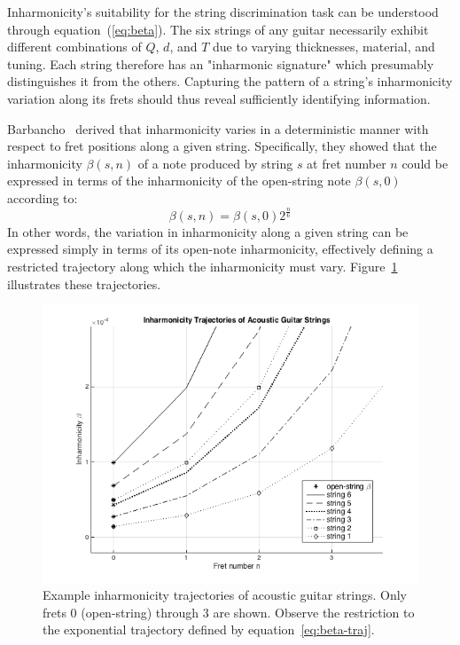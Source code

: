 \documentclass[12pt]{cmuthesis}
\begin{document}

Inharmonicity's suitability for the string discrimination task can be understood through equation~(\ref{eq:beta}). The six strings of any guitar necessarily exhibit different combinations of $Q$, $d$, and $T$ due to varying thicknesses, material, and tuning. Each string therefore has an "inharmonic signature" which presumably distinguishes it from the others. Capturing the pattern of a string's inharmonicity variation along its frets should thus reveal sufficiently identifying information.

Barbancho~\cite{barbanchoi2012} derived that inharmonicity varies in a deterministic manner with respect to fret positions along a given string. Specifically, they showed that the inharmonicity $\beta(s,n)$ of a note produced by string $s$ at fret number $n$ could be expressed in terms of the inharmonicity of the open-string note $\beta(s,0)$ according to:
\begin{equation} 
\label{eq:beta-traj}
\beta(s,n) = \beta(s,0)2^{\frac{n}{6}}
\end{equation}
In other words, the variation in inharmonicity along a given string can be expressed simply in terms of its open-note inharmonicity, effectively defining a restricted trajectory along which the inharmonicity must vary. Figure~\ref{fig:beta-trajectories-ag} illustrates these trajectories.

\begin{figure}[h] 
\label{fig:beta-trajectories-ag}
\centering
\includegraphics[scale=0.70]{beta-trajectories-ag}
\caption{Example inharmonicity trajectories of acoustic guitar strings. Only frets 0 (open-string) through 3 are shown. Observe the restriction to the exponential trajectory defined by equation~\eqref{eq:beta-traj}.}
\end{figure}
\end{document}
